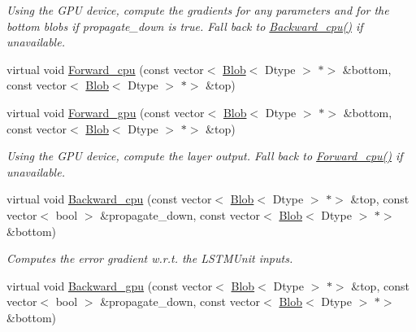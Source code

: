 \begin{DoxyCompactItemize}
\begin{DoxyCompactList}\small\item\em Using the G\+PU device, compute the gradients for any parameters and for the bottom blobs if propagate\+\_\+down is true. Fall back to \mbox{\hyperlink{classcaffe_1_1_l_s_t_m_unit_layer_aab97af46aeebdae3d7f7046aa6ba5f7f}{Backward\+\_\+cpu()}} if unavailable. \end{DoxyCompactList}\item 
virtual void \mbox{\hyperlink{classcaffe_1_1_l_s_t_m_unit_layer_adaa55c52685e42525b1a742b65a91362}{Forward\+\_\+cpu}} (const vector$<$ \mbox{\hyperlink{classcaffe_1_1_blob}{Blob}}$<$ Dtype $>$ $\ast$$>$ \&bottom, const vector$<$ \mbox{\hyperlink{classcaffe_1_1_blob}{Blob}}$<$ Dtype $>$ $\ast$$>$ \&top)
\item 
\mbox{\label{classcaffe_1_1_l_s_t_m_unit_layer_a20c18c7fe0a8a8fdd6cd700a420ecc1f}} 
virtual void \mbox{\hyperlink{classcaffe_1_1_l_s_t_m_unit_layer_a20c18c7fe0a8a8fdd6cd700a420ecc1f}{Forward\+\_\+gpu}} (const vector$<$ \mbox{\hyperlink{classcaffe_1_1_blob}{Blob}}$<$ Dtype $>$ $\ast$$>$ \&bottom, const vector$<$ \mbox{\hyperlink{classcaffe_1_1_blob}{Blob}}$<$ Dtype $>$ $\ast$$>$ \&top)
\begin{DoxyCompactList}\small\item\em Using the G\+PU device, compute the layer output. Fall back to \mbox{\hyperlink{classcaffe_1_1_l_s_t_m_unit_layer_ad44e302db28f57bfdfbbbde452deb4fd}{Forward\+\_\+cpu()}} if unavailable. \end{DoxyCompactList}\item 
virtual void \mbox{\hyperlink{classcaffe_1_1_l_s_t_m_unit_layer_a00435ee797cfc37f8aac4761f970cb59}{Backward\+\_\+cpu}} (const vector$<$ \mbox{\hyperlink{classcaffe_1_1_blob}{Blob}}$<$ Dtype $>$ $\ast$$>$ \&top, const vector$<$ bool $>$ \&propagate\+\_\+down, const vector$<$ \mbox{\hyperlink{classcaffe_1_1_blob}{Blob}}$<$ Dtype $>$ $\ast$$>$ \&bottom)
\begin{DoxyCompactList}\small\item\em Computes the error gradient w.\+r.\+t. the L\+S\+T\+M\+Unit inputs. \end{DoxyCompactList}\item 
\mbox{\label{classcaffe_1_1_l_s_t_m_unit_layer_ad89dd388a2e1067d654d866436508964}} 
virtual void \mbox{\hyperlink{classcaffe_1_1_l_s_t_m_unit_layer_ad89dd388a2e1067d654d866436508964}{Backward\+\_\+gpu}} (const vector$<$ \mbox{\hyperlink{classcaffe_1_1_blob}{Blob}}$<$ Dtype $>$ $\ast$$>$ \&top, const vector$<$ bool $>$ \&propagate\+\_\+down, const vector$<$ \mbox{\hyperlink{classcaffe_1_1_blob}{Blob}}$<$ Dtype $>$ $\ast$$>$ \&bottom)

\end{DoxyCompactItemize}
